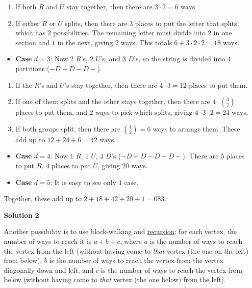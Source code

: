 \begin{enumerate}
            \begin{enumerate}[label=(\roman*)]
                \item If both $R$ and $U$ stay together, then there are $3 \cdot 2=6$ ways.\item If either $R$ or $U$ splits, then there are $3$ places to put the letter that splits, which has $2$ possibilities. The remaining letter must divide into $2$ in one section and $1$ in the next, giving $2$ ways. This totals $6 + 3\cdot 2\cdot 2 = 18$ ways.
            \end{enumerate}
            
            \begin{itemize}
        \item \textbf{Case } $d = 3$: Now $2$ $R$'s, $2$ $U$'s, and $3$ $D$'s, so the string is divided into $4$ partitions ($-D-D-D-$).
            \end{itemize}
            
            \begin{enumerate}[label=(\roman*)]
                \item If the $R$'s and $U$'s stay together, then there are $4 \cdot 3 = 12$ places to put them.\item If one of them splits and the other stays together, then there are $4 \cdot {3\choose 2}$ places to put them, and $2$ ways to pick which splits, giving $4 \cdot 3 \cdot 2 = 24$ ways.\item If both groups split, then there are ${4\choose 2}=6$ ways to arrange them. These add up to $12 + 24 + 6 = 42$ ways.
            \end{enumerate}
            
            \begin{itemize}
        \item \textbf{Case } $d = 4$: Now $1$ $R$, $1$ $U$, $4$ $D$'s ($-D-D-D-D-$). There are $5$ places to put $R$, $4$ places to put $U$, giving $20$ ways.
        \item \textbf{Case } $d = 5$: It is easy to see only $1$ case.
            \end{itemize}
            Together, these add up to $2 + 18 + 42 + 20 + 1 = \boxed{083}$.

 



\textbf{Solution 2}

Another possibility is to use block-walking and \href{https://artofproblemsolving.com/wiki/index.php?title=Recursion}{recursion}: for each vertex, the number of ways to reach it is $a + b + c$, where $a$ is the number of ways to reach the vertex from the left (without having come to \textit{that} vertex (the one on the left) from below), $b$ is the number of ways to reach the vertex from the vertex diagonally down and left, and $c$ is the number of ways to reach the vertex from below (without having come to \textit{that} vertex (the one below) from the left).


\end{enumerate}
